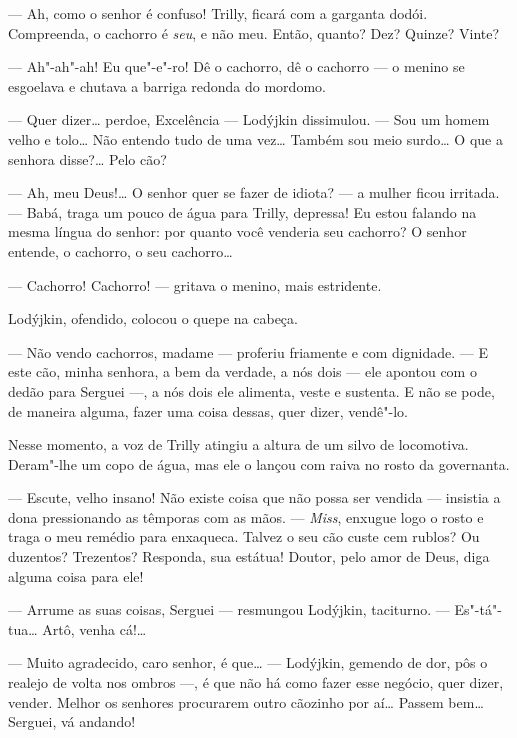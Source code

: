 --- Ah, como o senhor é confuso! Trilly, ficará com a garganta dodói.
Compreenda, o cachorro é \emph{seu}, e não meu. Então, quanto? Dez?
Quinze? Vinte?

--- Ah"-ah"-ah! Eu que"-e"-ro! Dê o cachorro, dê o cachorro --- o menino se
esgoelava e chutava a barriga redonda do mordomo.

--- Quer dizer\ldots{} perdoe, Excelência --- Lodýjkin dissimulou. --- Sou um
homem velho e tolo\ldots{} Não entendo tudo de uma vez\ldots{} Também sou meio
surdo\ldots{} O que a senhora disse?\ldots{} Pelo cão?

--- Ah, meu Deus!\ldots{} O senhor quer se fazer de idiota? --- a mulher
ficou irritada. --- Babá, traga um pouco de água para Trilly, depressa!
Eu estou falando na mesma língua do senhor: por quanto você venderia seu
cachorro? O senhor entende, o cachorro, o seu cachorro\ldots{}

--- Cachorro! Cachorro! --- gritava o menino, mais estridente.

Lodýjkin, ofendido, colocou o quepe na cabeça.

--- Não vendo cachorros, madame --- proferiu friamente e com dignidade.
--- E este cão, minha senhora, a bem da verdade, a nós dois --- ele
apontou com o dedão para Serguei ---, a nós dois ele alimenta, veste e
sustenta. E não se pode, de maneira alguma, fazer uma coisa dessas, quer
dizer, vendê"-lo.

Nesse momento, a voz de Trilly atingiu a altura de um silvo de
locomotiva. Deram"-lhe um copo de água, mas ele o lançou com raiva no
rosto da governanta.

--- Escute, velho insano! Não existe coisa que não possa ser vendida ---
insistia a dona pressionando as têmporas com as mãos. --- \emph{Miss},
enxugue logo o rosto e traga o meu remédio para enxaqueca. Talvez o seu
cão custe cem rublos? Ou duzentos? Trezentos? Responda, sua estátua!
Doutor, pelo amor de Deus, diga alguma coisa para ele!

--- Arrume as suas coisas, Serguei --- resmungou Lodýjkin, taciturno.
--- Es"-tá"-tua\ldots{} Artô, venha cá!\ldots{}


--- Muito agradecido, caro senhor, é que\ldots{} --- Lodýjkin, gemendo de
dor, pôs o realejo de volta nos ombros ---, é que não há como fazer esse
negócio, quer dizer, vender. Melhor os senhores procurarem outro
cãozinho por aí\ldots{} Passem bem\ldots{} Serguei, vá andando!

